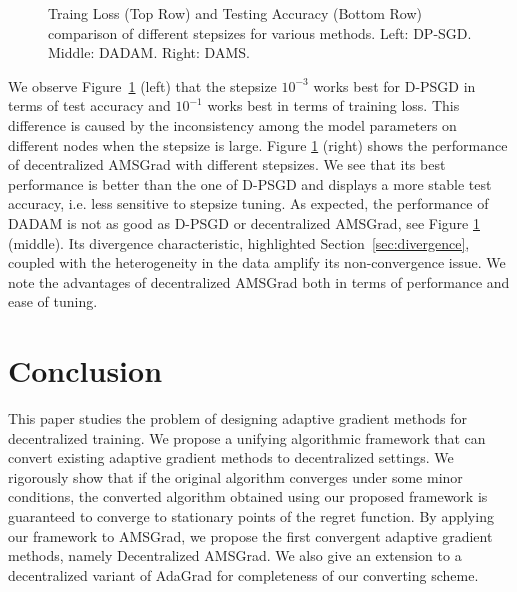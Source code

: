 \documentclass[anon,12pt]{colt2021} %
\begin{document}
\begin{figure}[H]
\begin{center}
    \end{center}
	\caption{Traing Loss (Top Row) and Testing Accuracy (Bottom Row) comparison of different stepsizes for various methods.
	Left:  DP-SGD.
	{Middle:} DADAM.
	{Right:} DAMS.
	}
	\label{fig: stepsize}
\end{figure}\vspace{-0.1in}

We observe Figure~\ref{fig: stepsize} (left) that the stepsize $10^{-3}$ works best for D-PSGD in terms of test accuracy and $10^{-1}$ works best in terms of training loss. 
This difference is caused by the inconsistency among the model parameters on different nodes when the stepsize is large. 
Figure \ref{fig: stepsize} (right) shows the performance of decentralized AMSGrad with different stepsizes.
We see that its best performance is better than the one of D-PSGD and displays a more stable test accuracy, i.e. less sensitive to stepsize tuning.
As expected, the performance of DADAM is not as good as D-PSGD or decentralized AMSGrad, see Figure \ref{fig: stepsize} (middle).
Its divergence characteristic, highlighted Section~\ref{sec:divergence}, coupled with the heterogeneity in the data amplify its non-convergence issue.  
We note the advantages of decentralized AMSGrad both in terms of performance and ease of tuning.

\vspace{-0.1in}
\section{Conclusion}\label{sec:conclusion}
\vspace{-0.05in}

This paper studies the problem of designing adaptive gradient methods for decentralized training. 
We propose a unifying algorithmic framework that can convert existing adaptive gradient methods to decentralized settings. 
We rigorously show that if the original algorithm converges under some minor conditions, the converted algorithm obtained using our proposed framework is guaranteed to converge to stationary points of the regret function. 
By applying our framework to AMSGrad, we propose the first convergent adaptive gradient methods, namely Decentralized AMSGrad. 
We also give an extension to a decentralized variant of AdaGrad for completeness of our converting scheme.
\end{document}

